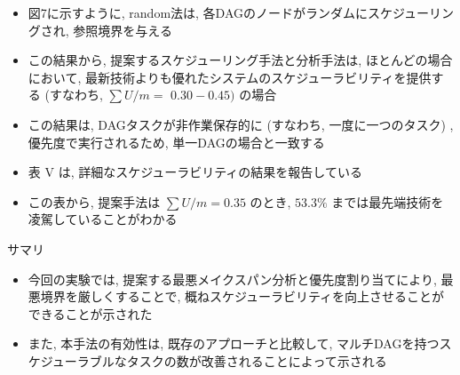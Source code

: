 \begin{frame}{}
    \begin{itemize}
        \item 図7に示すように, random法は, 各DAGのノードがランダムにスケジューリングされ, 参照境界を与える
\item この結果から, 提案するスケジューリング手法と分析手法は, ほとんどの場合において, 最新技術よりも優れたシステムのスケジューラビリティを提供する (すなわち, $\sum U / m=$  $0.30-0.45)$ の場合
\item この結果は, DAGタスクが非作業保存的に (すなわち, 一度に一つのタスク) , 優先度で実行されるため, 単一DAGの場合と一致する
\item 表 $\mathrm{V}$ は, 詳細なスケジューラビリティの結果を報告している
\item この表から, 提案手法は $\sum U / m=0.35$ のとき, $53.3 \%$ までは最先端技術を凌駕していることがわかる
    \end{itemize}
\end{frame}

\begin{frame}{サマリ}
    \begin{itemize}
        \item 今回の実験では, 提案する最悪メイクスパン分析と優先度割り当てにより, 最悪境界を厳しくすることで, 概ねスケジューラビリティを向上させることができることが示された
\item また, 本手法の有効性は, 既存のアプローチと比較して, マルチDAGを持つスケジューラブルなタスクの数が改善されることによって示される
    \end{itemize}
\end{frame}
